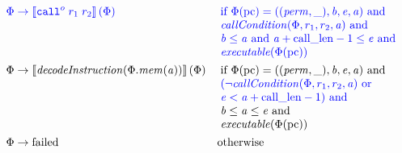 \documentclass[a3paper]{article}
\newcommand{\sem}[1]{\left\llbracket #1 \right\rrbracket}
\newcommand{\tand}{\text{ and }}
\newcommand{\tor}{\text{ or }}
\newcommand{\totherwise}{\text{otherwise }}
\newcommand{\sourcecolor}{\color{blue}}
\newcommand{\src}[1]{{\sourcecolor #1}}
\newcommand{\zinstr}[1]{\texttt{#1}}
\newcommand{\scall}[4][]{  
\ifthenelse{\equal{#3#4}{}}
  {\ensuremath{\zinstr{\src{call}}_{#1}^{#2}}}
  {\ensuremath{\zinstr{\src{call}}_{#1}^{#2} \; #3 \; #4}}
}
\newcommand{\perm}{\var{perm}}
\newcommand{\failed}{\mathrm{failed}}
\newcommand{\step}{\rightarrow}
\newcommand{\var}[1]{\mathit{#1}}
\newcommand{\mem}{\var{mem}}
\newcommand{\baddr}{\var{b}}
\newcommand{\eaddr}{\var{e}}
\newcommand{\aaddr}{\var{a}}
\newcommand{\constant}[1]{\mathrm{#1}}
\newcommand{\calllen}{\constant{call\_len}}
\newcommand{\pcreg}{\mathrm{pc}}
\newcommand{\plainfun}[2]{
  \ifthenelse{\equal{#2}{}}
  {\mathit{#1}}
  {\mathit{#1}(#2)}
}
\newcommand{\callCond}[1]{\plainfun{callCondition}{#1}}
\newcommand{\decInstr}[1]{\plainfun{decodeInstruction}{#1}}
\newcommand{\exec}[1]{\plainfun{executable}{#1}}
\begin{document}
\begin{align*}
  \src{\Phi} & \; \src{\step \sem{\scall{o}{r_1}{r_2}}(\Phi)} &  &\sourcecolor\left.\arraycolsep=0pt
                                                  \begin{array}[t]{l}
                                                    \text{if }\Phi(\pcreg) = ((\perm,\_),\baddr,\eaddr,\aaddr) \tand \\
                                                    \callCond{\Phi,r_1,r_2,\aaddr} \tand\\
                                                    \baddr \leq \aaddr \tand \aaddr + \calllen-1 \leq \eaddr \tand \\
                                                    \exec{\Phi(\pcreg)}
                                                  \end{array}\right.\\
  \Phi & \step \sem{\decInstr{\Phi.\mem(\aaddr)}}(\Phi) & &\left.\arraycolsep=0pt
                                                  \begin{array}[t]{l}
                                                    \text{if }\Phi(\pcreg) = ((\perm,\_),\baddr,\eaddr,\aaddr) \tand \\
                                                    \src{(\neg\callCond{\Phi,r_1,r_2,\aaddr} \tor}\\
                                                    \src{\eaddr < \aaddr + \calllen-1) \tand} \\
                                                    \baddr \leq \aaddr \leq \eaddr\tand\\
                                                    \exec{\Phi(\pcreg)}
                                                  \end{array}\right.\\
  \Phi& \step \failed & & \totherwise
\end{align*}
\end{document}
